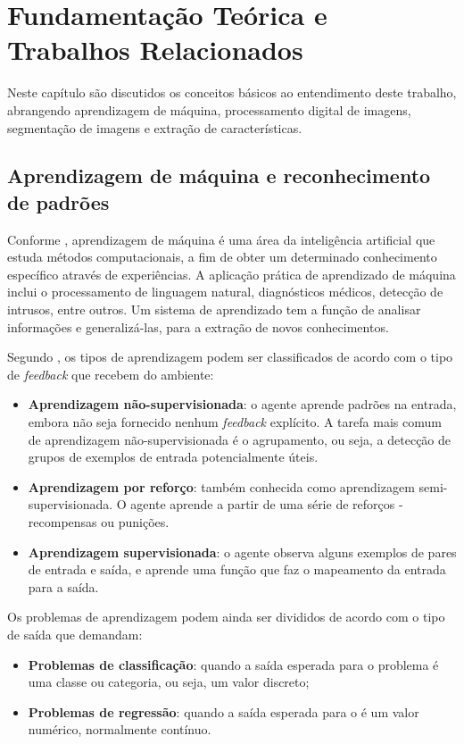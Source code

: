\chapter{Fundamentação Teórica e Trabalhos Relacionados}

Neste capítulo são discutidos os conceitos básicos ao entendimento deste trabalho, abrangendo aprendizagem de máquina, processamento digital de imagens, segmentação de imagens e extração de características.

\section{Aprendizagem de máquina e reconhecimento de padrões}

Conforme \cite{alpaydin:2010}, aprendizagem de máquina é uma área da inteligência artificial que estuda métodos computacionais, a fim de obter um determinado conhecimento específico através de experiências. A aplicação prática de aprendizado de máquina inclui o processamento de linguagem natural, diagnósticos médicos, detecção de intrusos, entre outros. Um sistema de aprendizado tem a função de analisar informações e generalizá-las, para a extração de novos conhecimentos.

Segundo \cite{russell:2010}, os tipos de aprendizagem podem ser classificados de acordo com o tipo de \textit{feedback} que recebem do ambiente:

\begin{itemize}
    \item \textbf{Aprendizagem não-supervisionada}: o agente aprende padrões na entrada, embora não seja fornecido nenhum \textit{feedback} explícito. A tarefa mais comum de aprendizagem não-supervisionada é o agrupamento, ou seja, a detecção de grupos de exemplos de entrada potencialmente úteis.
    \item \textbf{Aprendizagem por reforço}: também conhecida como aprendizagem semi-supervisionada. O agente aprende a partir de uma série de reforços - recompensas ou punições.
    \item \textbf{Aprendizagem supervisionada}: o agente observa alguns exemplos de pares de entrada e saída, e aprende uma função que faz o mapeamento da entrada para a saída. 
\end{itemize}

Os problemas de aprendizagem podem ainda ser divididos de acordo com o tipo de saída que demandam:

\begin{itemize}
	\item \textbf{Problemas de classificação}: quando a saída esperada para o problema é uma classe ou categoria, ou seja, um valor discreto;
	\item \textbf{Problemas de regressão}: quando a saída esperada para o é um valor numérico, normalmente contínuo.
\end{itemize}

